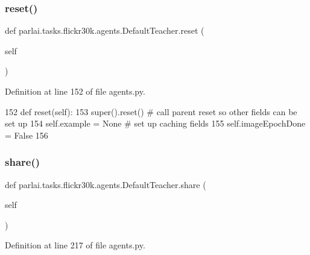 \subsubsection{\texorpdfstring{reset()}{reset()}}
{\footnotesize\ttfamily def parlai.\+tasks.\+flickr30k.\+agents.\+Default\+Teacher.\+reset (\begin{DoxyParamCaption}\item[{}]{self }\end{DoxyParamCaption})}



Definition at line 152 of file agents.\+py.


\begin{DoxyCode}
152     \textcolor{keyword}{def }reset(self):
153         super().reset()  \textcolor{comment}{# call parent reset so other fields can be set up}
154         self.example = \textcolor{keywordtype}{None}  \textcolor{comment}{# set up caching fields}
155         self.imageEpochDone = \textcolor{keyword}{False}
156 
\end{DoxyCode}
\mbox{\label{classparlai_1_1tasks_1_1flickr30k_1_1agents_1_1DefaultTeacher_ae64406b518a24c25b8d4db2c614cafea}} 
\subsubsection{\texorpdfstring{share()}{share()}}
{\footnotesize\ttfamily def parlai.\+tasks.\+flickr30k.\+agents.\+Default\+Teacher.\+share (\begin{DoxyParamCaption}\item[{}]{self }\end{DoxyParamCaption})}



Definition at line 217 of file agents.\+py.



